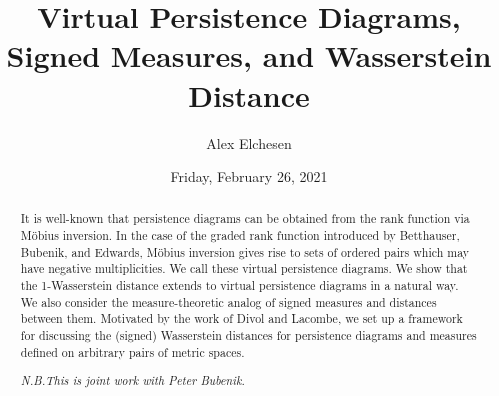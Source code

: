 \documentclass{UAmathtalk}
\author{Alex Elchesen}
\title{Virtual Persistence Diagrams, Signed Measures, and Wasserstein Distance}
\date{Friday, February 26, 2021}
\begin{document}
\maketitle

\begin{abstract}
It is well-known that persistence diagrams can be obtained from the rank function via M\"{o}bius inversion. 
In the case of the graded rank function introduced by Betthauser, Bubenik, and Edwards, M\"{o}bius inversion gives rise to sets of ordered pairs which may have negative multiplicities. 
We call these virtual persistence diagrams. 
We show that the 1-Wasserstein distance extends to virtual persistence diagrams in a natural way. 
We also consider the measure-theoretic analog of signed measures and distances between them. 
Motivated by the work of Divol and Lacombe, we set up a framework for discussing the (signed) Wasserstein distances for persistence diagrams and measures defined on arbitrary pairs of metric spaces. 

\emph{N.B.This is joint work with Peter Bubenik.}
\end{abstract}
\end{document}
